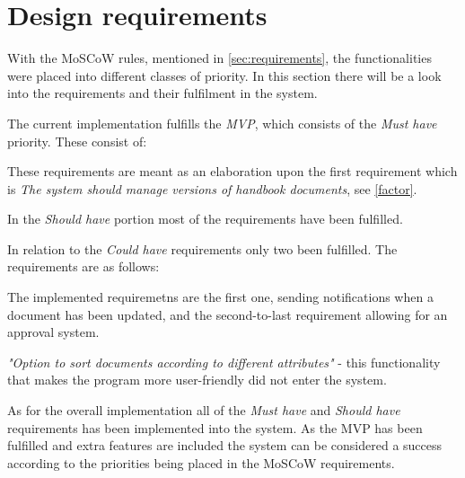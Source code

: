 \section{Design requirements}\label{sec:disdesignrequirements}
With the MoSCoW rules, mentioned in \cref{sec:requirements}, the functionalities were placed into different classes of priority.
In this section there will be a look into the requirements and their fulfilment in the system.

The current implementation fulfills the \textit{MVP}, which consists of the \textit{Must have} priority.
These consist of:


These requirements are meant as an elaboration upon the first requirement which is \textit{The system should manage versions of handbook documents}, see \cref{factor}.

In the \textit{Should have} portion most of the requirements have been fulfilled.



In relation to the \textit{Could have} requirements only two been fulfilled.
The requirements are as follows:



The implemented requiremetns are the first one, sending notifications when a document has been updated, and the second-to-last requirement allowing for an approval system.

\textit{"Option to sort documents according to different attributes"} - this functionality that makes the program more user-friendly did not enter the system.

As for the overall implementation all of the \textit{Must have} and \textit{Should have} requirements has been implemented into the system.
As the MVP has been fulfilled and extra features are included the system can be considered a success according to the priorities being placed in the MoSCoW requirements.
